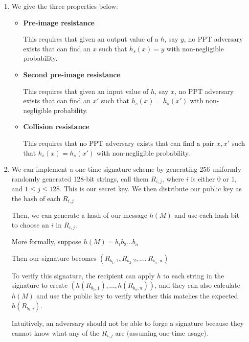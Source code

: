 


\begin{enumerate}[label=(\alph*)]
  \item
    We give the three properties below:

    \begin{itemize}
      \item
        \textbf{Pre-image resistance}

        This requires that given an output value of a $h$, say $y$, no PPT adversary exists that can find an $x$ such that $h_s(x) = y$ with non-negligible probability.

      \item
        \textbf{Second pre-image resistance}

        This requires that given an input value of $h$, say $x$, no PPT adversary exists that can find an $x'$ such that $h_s(x) = h_s(x')$ with non-negligible probability.

      \item
        \textbf{Collision resistance}

        This requires that no PPT adversary exists that can find a pair $x,x'$ such that $h_s(x) = h_s(x')$ with non-negligible probability.
    \end{itemize}

  \item
    We can implement a one-time signature scheme by generating 256 uniformly randomly generated 128-bit strings, call them $R_{i,j}$, where $i$ is either 0 or 1, and $1 \leq j \leq 128$. This is our secret key. We then distribute our public key as the hash of each $R_{i,j}$

    Then, we can generate a hash of our message $h(M)$ and use each hash bit to choose an $i$ in $R_{i,j}$.

    More formally, suppose $h(M) = b_1b_2\ldots b_n$

    Then our signature becomes $(R_{b_1,1}, R_{b_2,2}, \ldots,  R_{b_n,n})$

    To verify this signature, the recipient can apply $h$ to each string in the signature to create $(h(R_{b_1,1}), \ldots, h(R_{b_n, n}))$, and they can also calculate $h(M)$ and use the public key to verify whether this matches the expected $h(R_{b_i, i})$.

    Intuitively, an adversary should not be able to forge a signature because they cannot know what any of the $R_{i,j}$ are (assuming one-time usage).


\end{enumerate}
